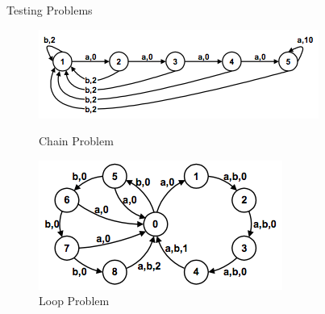 \documentclass{beamer}
\begin{document}
\begin{frame}{Testing Problems}

\begin{figure}
\centering
\begin{minipage}{0.5\textwidth}
\includegraphics[width=\textwidth]{chain.png}
\caption{Chain Problem}
\end{minipage}%
\begin{minipage}{0.5\textwidth}
\includegraphics[width=\textwidth]{loop.png}
\caption{Loop Problem}
\end{minipage}%
\end{figure}


\end{frame}
\end{document}
